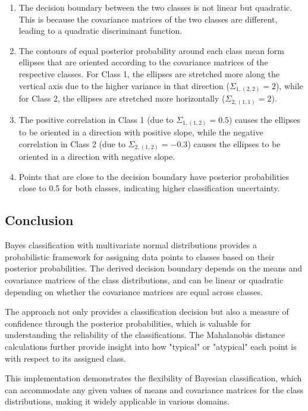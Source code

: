 \documentclass[12pt]{article}
\begin{document}
\begin{enumerate}
    \item The decision boundary between the two classes is not linear but quadratic. This is because the covariance matrices of the two classes are different, leading to a quadratic discriminant function.
    
    \item The contours of equal posterior probability around each class mean form ellipses that are oriented according to the covariance matrices of the respective classes. For Class 1, the ellipses are stretched more along the vertical axis due to the higher variance in that direction ($\Sigma_{1,(2,2)} = 2$), while for Class 2, the ellipses are stretched more horizontally ($\Sigma_{2,(1,1)} = 2$).
    
    \item The positive correlation in Class 1 (due to $\Sigma_{1,(1,2)} = 0.5$) causes the ellipses to be oriented in a direction with positive slope, while the negative correlation in Class 2 (due to $\Sigma_{2,(1,2)} = -0.3$) causes the ellipses to be oriented in a direction with negative slope.
    
    \item Points that are close to the decision boundary have posterior probabilities close to 0.5 for both classes, indicating higher classification uncertainty.
\end{enumerate}

\subsection{Conclusion}
Bayes classification with multivariate normal distributions provides a probabilistic framework for assigning data points to classes based on their posterior probabilities. The derived decision boundary depends on the means and covariance matrices of the class distributions, and can be linear or quadratic depending on whether the covariance matrices are equal across classes.

The approach not only provides a classification decision but also a measure of confidence through the posterior probabilities, which is valuable for understanding the reliability of the classifications. The Mahalanobis distance calculations further provide insight into how "typical" or "atypical" each point is with respect to its assigned class.

This implementation demonstrates the flexibility of Bayesian classification, which can accommodate any given values of means and covariance matrices for the class distributions, making it widely applicable in various domains.
\end{document}

